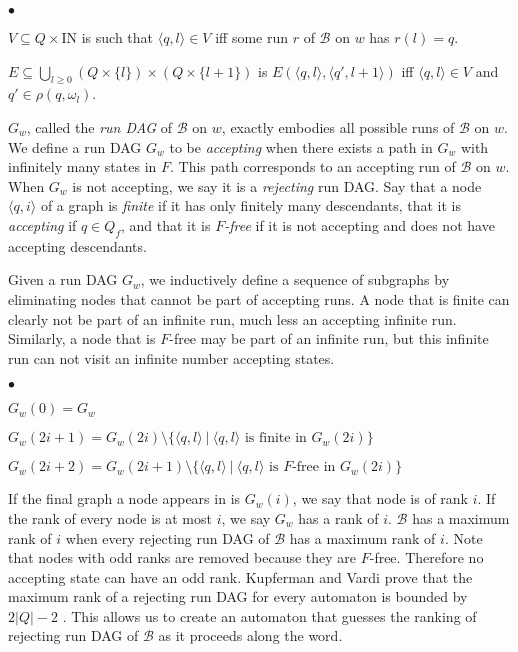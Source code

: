 \documentclass{LMCS}
\newcommand{\zug}[1]{\langle #1  \rangle}
\newcommand{\N}{\mbox{I$\!$N}}
\newcommand{\B}{{\mathcal B}}
\newcommand{\abs}[1]{\lvert#1\rvert}
\begin{document}
\begin{iteMize}{$\bullet$}
\item $V \subseteq Q \times \N$ is such that $\zug{q,l} \in V$ iff some run $r$ of
$\B$ on $w$ has $r(l)=q$.
\item $E \subseteq \bigcup_{l \geq 0} (Q \times \{l\}) \times (Q \times
\{l+1\})$ is
$E(\zug{q,l},\zug{q',l+1})$ iff $\zug{q,l} \in V$ and $q' \in \rho(q,
\omega_l)$.
\end{iteMize}

$G_w$, called the \emph{run DAG} of $\B$ on $w$, exactly embodies all possible
runs of $\B$ on $w$. We define a run DAG $G_w$ to be {\em accepting} when there exists
a path in $G_w$ with infinitely many states in $F$. This path corresponds to an
accepting run of $\B$ on $w$. When $G_w$ is not accepting, we say it is a
\emph{rejecting} run DAG.  Say that a node $\zug{q,i}$ of a graph is \emph{finite} if
it has only finitely many descendants, that it is {\em accepting} if $q \in Q_f$, and
that it is \emph{$F$-free} if it is not accepting and does not have 
accepting descendants.  

Given a run DAG $G_w$, we inductively define a sequence of subgraphs by
eliminating nodes that cannot be part of accepting runs. A node that is finite
can clearly not be part of an infinite run, much less an accepting infinite
run. Similarly, a node that is $F$-free may be part of an infinite run, but this
infinite run can not visit an infinite number accepting states.

\begin{iteMize}{$\bullet$}
\item $G_w(0)=G_w$
\item $G_w(2i+1)=G_w(2i) \setminus \{\zug{q,l}~|~\zug{q,l}\text { is finite in }G_w(2i)\}$
\item $G_w(2i+2)=G_w(2i+1) \setminus \{\zug{q,l}~|~\zug{q,l}\text { is }F\text{-free in }G_w(2i)\}$
\end{iteMize}
If the final graph a node appears in is $G_w(i)$, we say that
node is of rank $i$. If the rank of every node is at most $i$, we say $G_w$ has a
rank of $i$.  $\B$ has a maximum rank of $i$ when  every rejecting run DAG of
$\B$ has a maximum rank of $i$.  Note that nodes with odd ranks are removed
because they are $F$-free. Therefore no accepting state can have an odd rank.
Kupferman and Vardi prove that the maximum rank of a rejecting run DAG for every
automaton is bounded by $2\abs{Q}-2$ \cite{KV97b}. This allows us to create an automaton that
guesses the ranking of rejecting run DAG of $\B$ as it proceeds along the
word.
\end{document}
